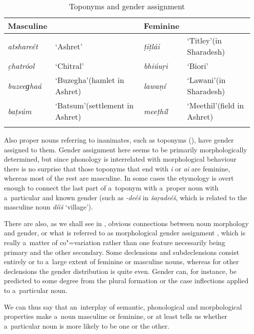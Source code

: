 \begin{table}[b]
\caption{Toponyms and gender assignment}
\begin{tabularx}{\textwidth}{ l Q l Q }
\lsptoprule
Masculine &
&
Feminine &
\\\midrule
\textit{atshareét} &
`Ashret' &
\textit{ṭiṭlái} &
`Titley'\newline (in Sharadesh)\\
\textit{c̣hatróol} &
`Chitral' &
\textit{bhiúuṛi} &
`Biori'\\
\textit{buzeeɡhaá} &
`Buzegha'\newline (hamlet in Ashret) &
\textit{lawaṇí} &
`Lawani'\newline (in Sharadesh)\\
\textit{baṭsúm} &
`Batsum'\newline (settlement in Ashret) &
\textit{meeṭhíl} &
`Meethil'\newline (field in Ashret)\\\lspbottomrule
\end{tabularx}
\label{tab:4-3}
\end{table}


Also proper nouns referring to inanimates, such as toponyms (), have gender assigned to them. Gender assignment here seems to be primarily morphologically determined, but since phonology is interrelated with morphological behaviour there is no surprise that those toponyms that end with \textit{i} or \textit{ai} are feminine, whereas most of the rest are masculine. In some cases the etymology is overt enough to connect the last part of a~toponym with a~proper noun with a~particular and known gender (such as \textit{-deéš} in \textit{šaṛadeéš}, which is related to the masculine noun \textit{díiš} `village').


There are also, as we shall see in , obvious connections between noun morphology and gender, or what is referred to as morphological gender assignment \citep[34--50]{corbett1991}, which is really a~matter of co"=variation rather than one feature necessarily being primary and the other secondary. Some declensions and subdeclensions consist entirely or to a~large extent of feminine or masculine nouns, whereas for other declensions the gender distribution is quite even. Gender can, for instance, be predicted to some degree from the plural formation or the case inflections applied to a~particular noun.


We can thus say that an~interplay of semantic, phonological and morphological properties make a~noun masculine or feminine, or at least tells us whether a~particular noun is more likely to be one or the other. 


